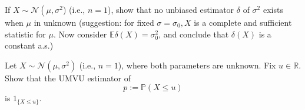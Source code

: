 \begin{ex}
    If \(X \sim \mathcal{N}\left(\mu, \sigma^{2}\right.\)) (i.e., \(n=1\)), show that no unbiased estimator \(\delta\) of \(\sigma^{2}\) exists when \(\mu\) in unknown (suggestion: for fixed \(\sigma=\sigma_{0}, X\) is a complete and sufficient statistic for \(\mu\). Now consider \(\mathbb{E} \delta(X)=\sigma_{0}^{2}\), and conclude that \(\delta(X)\) is a constant a.s.)
\end{ex}

\begin{ex}
    Let \(X \sim \mathcal{N}\left(\mu, \sigma^{2}\right)\) (i.e., \(n=1\)), where both parameters are unknown. Fix \(u \in \mathbb{R}\). Show that the UMVU estimator of
    \[
    p:=\mathbb{P}(X \leq u)
    \]
    is \(1_{\{X \leq u\}}\). 
\end{ex}

